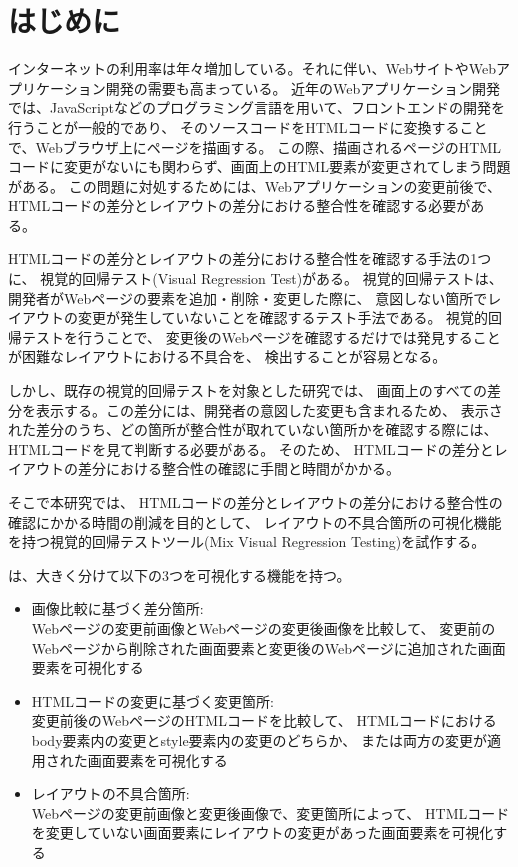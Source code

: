 \chapter{はじめに}\label{cha:Introduction}
インターネットの利用率は年々増加している\cite{Soumusyou}。それに伴い、WebサイトやWebアプリケーション開発の需要も高まっている。
近年のWebアプリケーション開発では、JavaScriptなどのプログラミング言語を用いて、フロントエンドの開発を行うことが一般的であり、
そのソースコードをHTMLコードに変換することで、Webブラウザ上にページを描画する。
この際、描画されるページのHTMLコードに変更がないにも関わらず、画面上のHTML要素が変更されてしまう問題がある。
この問題に対処するためには、Webアプリケーションの変更前後で、HTMLコードの差分とレイアウトの差分における整合性を確認する必要がある。
\par
HTMLコードの差分とレイアウトの差分における整合性を確認する手法の1つに、
視覚的回帰テスト(Visual Regression Test)がある。
視覚的回帰テストは、開発者がWebページの要素を追加・削除・変更した際に、
意図しない箇所でレイアウトの変更が発生していないことを確認するテスト手法である。
視覚的回帰テストを行うことで、
変更後のWebページを確認するだけでは発見することが困難なレイアウトにおける不具合を、
検出することが容易となる。

しかし、既存の視覚的回帰テストを対象とした研究では、
画面上のすべての差分を表示する。この差分には、開発者の意図した変更も含まれるため、
表示された差分のうち、どの箇所が整合性が取れていない箇所かを確認する際には、
HTMLコードを見て判断する必要がある。
そのため、
HTMLコードの差分とレイアウトの差分における整合性の確認に手間と時間がかかる。
\par
そこで本研究では、
HTMLコードの差分とレイアウトの差分における整合性の確認にかかる時間の削減を目的として、
レイアウトの不具合箇所の可視化機能を持つ視覚的回帰テストツール\toolName(Mix Visual Regression Testing)を試作する。
\par
\toolName は、大きく分けて以下の3つを可視化する機能を持つ。
\begin{itemize}
    \item 画像比較に基づく差分箇所:\\
          Webページの変更前画像とWebページの変更後画像を比較して、
          変更前のWebページから削除された画面要素と変更後のWebページに追加された画面要素を可視化する
    \item HTMLコードの変更に基づく変更箇所:\\
          変更前後のWebページのHTMLコードを比較して、
          HTMLコードにおけるbody要素内の変更とstyle要素内の変更のどちらか、
          または両方の変更が適用された画面要素を可視化する
    \item レイアウトの不具合箇所:\\
          Webページの変更前画像と変更後画像で、変更箇所によって、
          HTMLコードを変更していない画面要素にレイアウトの変更があった画面要素を可視化する
\end{itemize}

